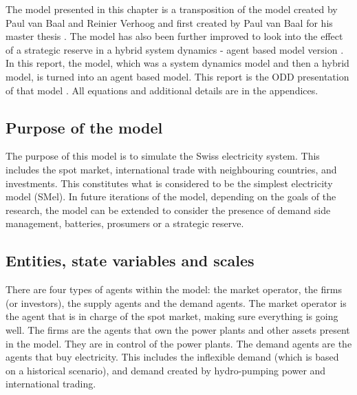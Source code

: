 The model presented in this chapter is a transposition of the model created by Paul van Baal and Reinier Verhoog and first created by Paul van Baal for his master thesis \citep{van2016business}. The model has also been further improved to look into the effect of a strategic reserve in a hybrid system dynamics - agent based model version \citep{van2019effectiveness}. In this report, the model, which was a system dynamics model and then a hybrid model, is turned into an agent based model. This report is the ODD presentation of that model \citep{grimm2010odd}. All equations and additional details are in the appendices.

\subsection{Purpose of the model}
\label{ssec:purpose}

The purpose of this model is to simulate the Swiss electricity system. This includes the spot market, international trade with neighbouring countries, and investments. This constitutes what is considered to be the simplest electricity model (SMel). In future iterations of the model, depending on the goals of the research, the model can be extended to consider the presence of demand side management, batteries, prosumers or a strategic reserve.


\subsection{Entities, state variables and scales}
\label{ssec:entities}

There are four types of agents within the model: the market operator, the firms (or investors), the supply agents and the demand agents. The market operator is the agent that is in charge of the spot market, making sure everything is going well. The firms are the agents that own the power plants and other assets present in the model. They are in control of the  power plants. The demand agents are the agents that buy electricity. This includes the inflexible demand (which is based on a  historical scenario), and demand created by hydro-pumping power and international trading.


